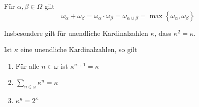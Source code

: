 \documentclass[12pt]{article}
\begin{document}
\begin{theorem}{}{}
    Für $\alpha, \beta \in \Omega$ gilt
    $$
        \omega_\alpha + \omega_\beta = \omega_\alpha \cdot \omega_\beta = \omega_{\alpha \cup \beta} = \max\left\{\omega_\alpha, \omega_\beta\right\}
    $$

    Insbesondere gilt für unendliche Kardinalzahlen $\kappa$, dass $\kappa^2 = \kappa$.
\end{theorem}

\begin{corollary}{}{}
    Ist $\kappa$ eine unendliche Kardinalzahlen, so gilt
    \begin{enumerate}[label=\alph*)]
        \item Für alle $n \in \omega$ ist $\kappa^{n + 1} = \kappa$
        \item $\sum_{n \in \omega} \kappa^n = \kappa$
        \item $\kappa^\kappa = 2^\kappa$
    \end{enumerate}
\end{corollary}
\end{document}
